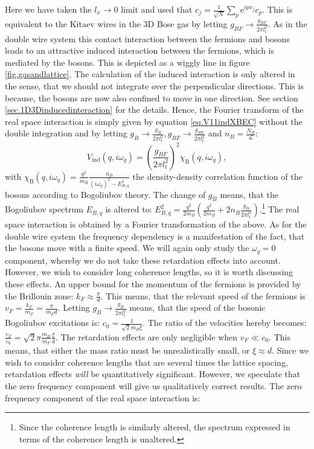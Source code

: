 Here we have taken the $l_x \to 0$ limit and used that $c_j = \frac{1}{\sqrt{N}}\sum_p \text{e}^{ipx_j}c_p$. This is equivalent to the Kitaev wires in the 3D Bose gas by letting $g_{BF} \to \frac{g_{BF}}{2\pi l_t^2}$. As in the double wire system this contact interaction between the fermions and bosons leads to an attractive induced interaction between the fermions, which is mediated by the bosons. This is depicted as a wiggly line in figure \ref{fig.gasandlattice}. The calculation of the induced interaction is only altered in the sense, that we should not integrate over the perpendicular directions. This is because, the bosons are now also confined to move in one direction. See section \ref{sec.1D3Dinducedinteraction} for the details. Hence, the Fourier transform of the real space interaction is simply given by equation \eqref{eq.V11indXBEC} without the double integration and by letting $g_B \to \frac{g_B}{2\pi l_t^2}, g_{BF} \to \frac{g_{BF}}{2\pi l_t^2}$ and $n_B = \frac{N_B}{\mathcal{L}}$:
\begin{equation}
V_{\text{ind}}(q, i\omega_q) = \left(\frac{g_{BF}}{2\pi l_t^2}\right)^2 \chi_\text{B}(q, i\omega_q), 
\label{eq.VFFmomentumspace.kitaevchain}
\end{equation}
with $\chi_\text{B}(q, i\omega_q) = \frac{q^2}{m_B}\frac{n_B}{(i\omega_q)^2 - E_{B,q}^2}$ the density-density correlation function of the bosons according to Bogoliubov theory. The change of $g_B$ means, that the Bogoliubov spectrum $E_{B,q}$ is altered to: $E_{B,q}^2 = \frac{q^2}{2m_B}\left(\frac{q^2}{2m_B} + 2n_B\frac{g_B}{2\pi l_t^2}\right)$.\footnote{Since the coherence length is similarly altered, the spectrum expressed in terms of the coherence length is unaltered.} The real space interaction is obtained by a Fourier transformation of the above. As for the double wire system the frequency dependency is a manifestation of the fact, that the bosons move with a finite speed. We will again only study the $\omega_q = 0$ component, whereby we do not take these retardation effects into account. However, we wish to consider long coherence lengths, so it is worth discussing these effects. An upper bound for the momentum of the fermions is provided by the Brillouin zone: $k_F \approx \frac{\pi}{d}$. This means, that the relevant speed of the fermions is $v_F = \frac{k_F}{m_F} = \frac{\pi}{m_Fd}$. Letting $g_B \to \frac{g_B}{2\pi l_t^2}$ means, that the speed of the bosonic Bogoliubov excitations is: $c_0 = \frac{1}{\sqrt{2}m_B\xi}$. The ratio of the velocities hereby becomes: $\frac{v_F}{c_0} = \sqrt{2}\pi\frac{m_B}{m_F}\frac{\xi}{d}$. The retardation effects are only negligible when $v_F\ll c_0$. This means, that either the mass ratio must be unrealistically small, or $\xi \approx d$. Since we wish to consider coherence lengths that are several times the lattice spacing, retardation effects \textit{will} be quantitatively significant. However, we speculate that the zero frequency component will give us qualitatively correct results. The zero frequency component of the real space interaction is:

